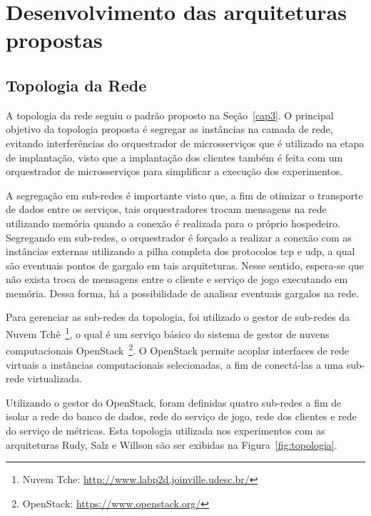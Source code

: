  
\chapter{Desenvolvimento das arquiteturas propostas}
\label{cap5}

\section{Topologia da Rede}
\label{sec:topologia}

A topologia da rede seguiu o padrão proposto na Seção~\ref{cap3}.
%
O principal objetivo da topologia proposta é segregar as instâncias na camada de rede, evitando interferências do orquestrador de microsserviços que é utilizado na etapa de implantação, visto que a implantação dos clientes também é feita com um orquestrador de microsserviços para simplificar a execução dos experimentos.

A segregação em sub-redes é importante visto que, a fim de otimizar o transporte de dados entre os serviços, tais orquestradores trocam mensagens na rede utilizando memória quando a conexão é realizada para o próprio hospedeiro.
%
Segregando em sub-redes, o orquestrador é forçado a realizar a conexão com as instâncias externas utilizando a pilha completa dos protocolos \ac{tcp} e \ac{udp}, a qual são eventuais pontos de gargalo em tais arquiteturas.
%
Nesse sentido, espera-se que não exista troca de mensagens entre o cliente e serviço de jogo executando em memória.
%
Dessa forma, há a possibilidade de analisar eventuais gargalos na rede.

Para gerenciar as sub-redes da topologia, foi utilizado o gestor de sub-redes da Nuvem Tchê~\footnote{Nuvem Tche: \url{http://www.labp2d.joinville.udesc.br/}}, o qual é um serviço básico do sistema de gestor de nuvens computacionais OpenStack~\footnote{OpenStack: \url{https://www.openstack.org/}}.
%
O OpenStack permite acoplar interfaces de rede virtuais a instâncias computacionais selecionadas, a fim de conectá-las a uma sub-rede virtualizada.

Utilizando o gestor do OpenStack, foram definidas quatro sub-redes a fim de isolar a rede do banco de dados, rede do serviço de jogo, rede dos clientes e rede do serviço de métricas.
%
Esta topologia utilizada nos experimentos com as arquiteturas Rudy, Salz e Willson são ser exibidas na Figura~\ref{fig:topologia}.


